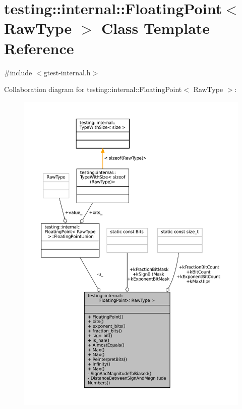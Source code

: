 \hypertarget{classtesting_1_1internal_1_1FloatingPoint}{}\section{testing\+:\+:internal\+:\+:Floating\+Point$<$ Raw\+Type $>$ Class Template Reference}
\label{classtesting_1_1internal_1_1FloatingPoint}


{\ttfamily \#include $<$gtest-\/internal.\+h$>$}



Collaboration diagram for testing\+:\+:internal\+:\+:Floating\+Point$<$ Raw\+Type $>$\+:
\nopagebreak
\begin{figure}[H]
\begin{center}
\leavevmode
\includegraphics[width=350pt]{classtesting_1_1internal_1_1FloatingPoint__coll__graph}
\end{center}
\end{figure}
